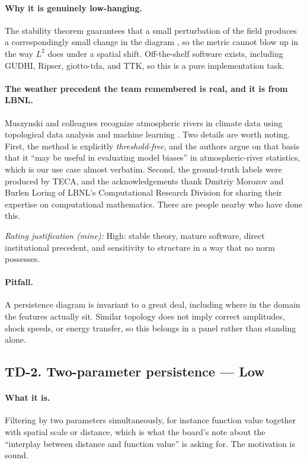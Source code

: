 \documentclass[11pt]{article}
\newcommand{\Low}{\textbf{Low}}
\newcommand{\rating}[1]{\par\smallskip\noindent\textit{Rating justification (mine):} #1}
\begin{document}
\paragraph{Why it is genuinely low-hanging.} The stability theorem guarantees that a small
perturbation of the field produces a correspondingly small change in the diagram
\cite{cohensteiner2007}, so the metric cannot blow up in the way $L^2$ does under a spatial
shift. Off-the-shelf software exists, including GUDHI, Ripser, giotto-tda, and TTK, so this
is a pure implementation task.

\paragraph{The weather precedent the team remembered is real, and it is from LBNL.}
Muszynski and colleagues recognize atmospheric rivers in climate data using topological data
analysis and machine learning \cite{muszynski2019}. Two details are worth noting. First, the
method is explicitly \emph{threshold-free}, and the authors argue on that basis that it ``may
be useful in evaluating model biases'' in atmospheric-river statistics, which is our use case
almost verbatim. Second, the ground-truth labels were produced by TECA, and the
acknowledgements thank Dmitriy Morozov and Burlen Loring of LBNL's Computational Research
Division for sharing their expertise on computational mathematics. There are people nearby
who have done this.

\rating{High: stable theory, mature software, direct institutional precedent, and
sensitivity to structure in a way that no norm possesses.}

\paragraph{Pitfall.} A persistence diagram is invariant to a great deal, including where in
the domain the features actually sit. Similar topology does not imply correct amplitudes,
shock speeds, or energy transfer, so this belongs in a panel rather than standing alone.

\subsection{TD-2. Two-parameter persistence --- \Low{}}

\paragraph{What it is.} Filtering by two parameters simultaneously, for instance function
value together with spatial scale or distance, which is what the board's note about the
``interplay between distance and function value'' is asking for. The motivation is sound.
\end{document}
